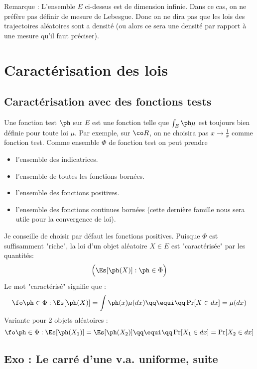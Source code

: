 \documentclass{article}
\begin{document}
Remarque : L'ensemble $E$ ci-dessus est de dimension infinie. Dans ce cas, on ne préfère pas définir de mesure de Lebesgue. Donc on ne dira pas que les lois des trajectoires aléatoires sont a  densité (ou alors ce sera une densité par rapport à une mesure qu'il faut préciser). 

 



\section{Caractérisation des lois}





\subsection{Caractérisation avec des fonctions tests}


Une fonction test  $\ph$ sur $E$ est une fonction telle que $\int_E\ph \mu$ est toujours bien définie pour toute loi $\mu$.  Par exemple, sur $\co R$, on ne choisira pas $x\to \frac 1 x$ comme fonction test.  Comme ensemble $\Phi$ de fonction test on peut prendre
\begin{itemize}
\item l'ensemble des indicatrices.
\item  l'ensemble de toutes les fonctions bornées. 
\item  l'ensemble des fonctions positives. 
\item  l'ensemble des fonctions continues bornées (cette dernière famille nous sera utile pour la convergence de loi).  
\end{itemize}
Je conseille de choisir par défaut les fonctions positives.  Puisque $\Phi$ est suffisamment "riche",     la loi d'un objet aléatoire $X\in E$ est "caractérisée" par  les quantités:
$$
\Big(  \Es[ \ph(X)]   : \ph \in \Phi    \Big)
$$
Le mot "caractérisé" signifie que : 
$$
\fo \ph \in \Phi :   \Es[ \ph(X)]=  \int \ph(x)   \mu(dx) \qq   \equi\qq  \Pr[X\in dx] = \mu(dx)
$$
Variante pour 2 objets aléatoires :
$$
\fo \ph \in \Phi :   \Es[ \ph(X_1)]=\Es[\ph(X_2) ]   \qq \equi \qq \Pr[X_1\in dx] = \Pr[X_2\in dx]  
$$



\subsection{Exo : Le carré d'une v.a. uniforme, suite}
\end{document}
